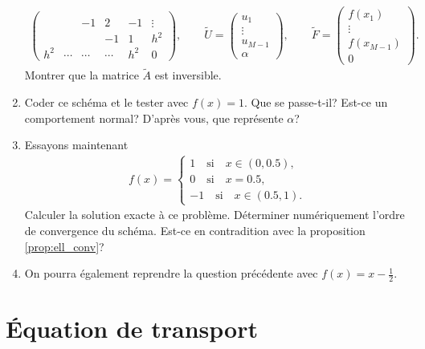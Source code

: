 \documentclass[12pt,a4paper,twoside]{article}
\begin{document}
\begin{exercise}
\begin{enumerate}
\begin{align*}
\begin{pmatrix}
        \\
        & & -1 & 2 & -1 & \vdots
        \\
        & &    & -1 & 1 & h^2
        \\
        h^2 & \cdots & \cdots & \cdots &  h^2 & 0
      \end{pmatrix} ,
      \qquad \widetilde{U} = 
      \begin{pmatrix}
        u_1 \\ \vdots \\ u_{M-1} \\ \alpha
      \end{pmatrix} ,
      \qquad \widetilde{F} = 
      \begin{pmatrix}
        f(x_1) \\ \vdots \\ f(x_{M-1}) \\ 0
      \end{pmatrix} .
    \end{align*}
    Montrer que la matrice $\widetilde{A}$ est inversible.
  \item Coder ce sch\'ema et le tester avec $f(x)=1$.
    Que se passe-t-il? Est-ce un comportement normal?
    D'apr\`es vous, que repr\'esente $\alpha$?
  \item Essayons maintenant 
    \begin{align*}
      f(x) = \left\{
      \begin{array}{l}
        1 \quad \text{si} \quad x \in (0,0.5),
        \\
        0 \quad \text{si} \quad x=0.5,
        \\
        -1 \quad \text{si} \quad x \in (0.5,1).
      \end{array}
      \right.
    \end{align*}
    Calculer la solution exacte \`a ce probl\`eme. 
    D\'eterminer num\'eriquement l'ordre de convergence du sch\'ema. 
    Est-ce en contradition avec la proposition \ref{prop:ell_conv}?

  \item On pourra \'egalement reprendre la question pr\'ec\'edente avec
    $f(x) = x-\frac{1}{2}$.
  \end{enumerate}
\end{exercise}

\section{\'Equation de transport}
\end{document}
